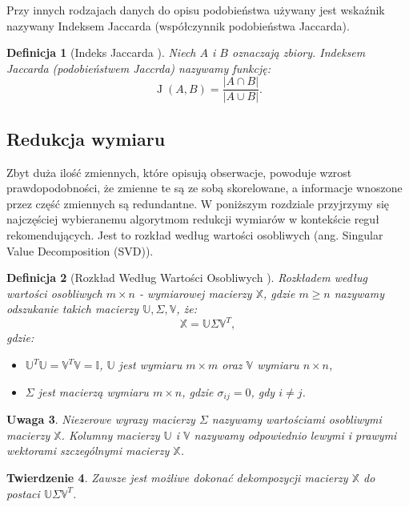 \documentclass[12pt,a4paper]{report}
\newtheorem{df}{Definicja}[chapter]
\newtheorem{tw}[df]{Twierdzenie}
\newtheorem{uwaga}[df]{Uwaga}
\newcommand{\J}[2]{\operatorname{J}\left({#1}, {#2} \right)}
\begin{document}
Przy innych rodzajach danych do opisu podobieństwa używany jest wskaźnik nazywany Indeksem Jaccarda (współczynnik podobieństwa Jaccarda). 
\begin{df}[Indeks Jaccarda  \citep{bre}]
Niech $\mathit{A}$ i $\mathit{B}$ oznaczają zbiory. Indeksem Jaccarda (podobieństwem Jaccrda) nazywamy funkcję:
$$
\J{\mathit{A}}{\mathit{B}}=\frac{|\mathit{A}\cap \mathit{B}|}{|\mathit{A} \cup \mathit{B}|}.
$$
\end{df}

\subsection{Redukcja wymiaru}
Zbyt duża ilość zmiennych, które opisują obserwacje, powoduje wzrost prawdopodobności, że zmienne te są ze sobą skorelowane, a informacje wnoszone przez część zmiennych są redundantne. W poniższym rozdziale przyjrzymy się najczęściej wybieranemu algorytmom redukcji wymiarów w kontekście reguł rekomendujących. Jest to rozkład według wartości osobliwych (ang. Singular Value Decomposition (SVD)).

\begin{df} [Rozkład Według Wartości Osobliwych {\citep{ulafiir}}]%
Rozkładem według wartości osobliwych $m\times n$ - wymiarowej macierzy $\mathbb{X}$, gdzie $m\geq n$ nazywamy odszukanie takich macierzy $\mathbb{U}, \Sigma, \mathbb{V}$, że:
$$
\mathbb{X}=\mathbb{U} \Sigma \mathbb{V}^T,
$$
gdzie:
\begin{itemize}
\item $\mathbb{U}^T \mathbb{U} = \mathbb{V}^T \mathbb{V} = \mathbb{I}$, $\mathbb{U}$ jest wymiaru $m \times m$ oraz $\mathbb{V}$ wymiaru $n \times n$,
\item $\Sigma$ jest macierzą wymiaru $m \times n$, gdzie $\sigma_{ij} = 0$, gdy $i \neq j$.	
\end{itemize}
\end{df}

\begin{uwaga}{\citep{ulafiir}}
Niezerowe wyrazy macierzy $\Sigma$ nazywamy wartościami osobliwymi macierzy $\mathbb{X}$.
Kolumny macierzy $\mathbb{U}$ i $\mathbb{V}$ nazywamy odpowiednio lewymi i prawymi wektorami szczególnymi macierzy $\mathbb{X}$.
\end{uwaga}

\begin{tw}
Zawsze jest możliwe dokonać dekompozycji macierzy $\mathbb{X}$ do postaci $\mathbb{U} \Sigma \mathbb{V}^T$.
\end{tw}
\end{document}
